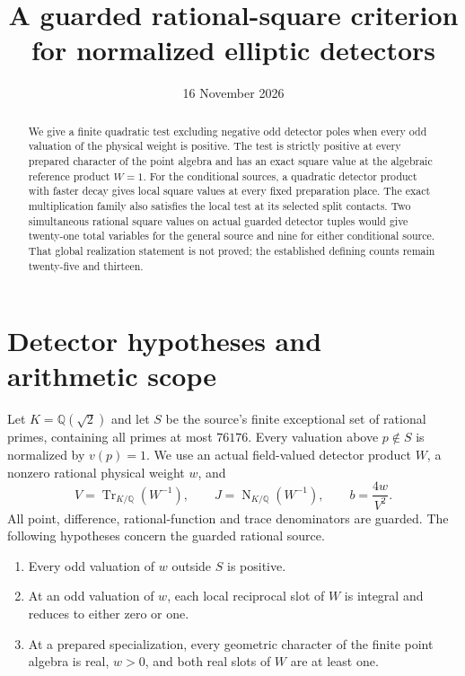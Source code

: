 \documentclass[11pt,a4paper]{article}
\title{A guarded rational-square criterion for normalized elliptic detectors}
\author{}\date{16 November 2026}
\newcommand{\Q}{\mathbb Q}\newcommand{\Z}{\mathbb Z}
\DeclareMathOperator{\Tr}{Tr}\DeclareMathOperator{\Nm}{N}
\begin{document}
\maketitle
\begin{abstract}
We give a finite quadratic test excluding negative odd detector poles
when every odd valuation of the physical weight is positive. The test
is strictly positive at every prepared character of the point algebra
and has an exact square value at the algebraic reference product
$W=1$. For the conditional sources, a quadratic detector product with
faster decay gives local square values at every fixed preparation
place. The exact multiplication family also satisfies the local test
at its selected split contacts. Two simultaneous rational square values
on actual guarded detector tuples would give twenty-one total variables
for the general source and nine for either conditional source. That
global realization statement is not proved; the established defining
counts remain twenty-five and thirteen.
\end{abstract}

\section{Detector hypotheses and arithmetic scope}

Let $K=\Q(\sqrt2)$ and let $S$ be the source's finite exceptional
set of rational primes, containing all primes at most $76176$.
Every valuation above
$p\notin S$ is normalized by $v(p)=1$. We use an actual field-valued
detector product $W$, a nonzero rational physical weight $w$, and
\begin{equation}\label{eq:native}
 V=\Tr_{K/\Q}(W^{-1}),\qquad
 J=\Nm_{K/\Q}(W^{-1}),\qquad b=\frac{4w}{V^2}.
\end{equation}
All point, difference, rational-function and trace denominators are
guarded. The following hypotheses concern the guarded rational source.
\begin{enumerate}
\item Every odd valuation of $w$ outside $S$ is positive.
\item At an odd valuation of $w$, each local reciprocal slot of $W$
is integral and reduces to either zero or one.
\item At a prepared specialization, every geometric character of the
finite point algebra is real, $w>0$, and both real slots of $W$ are
at least one.
\end{enumerate}
\end{document}

